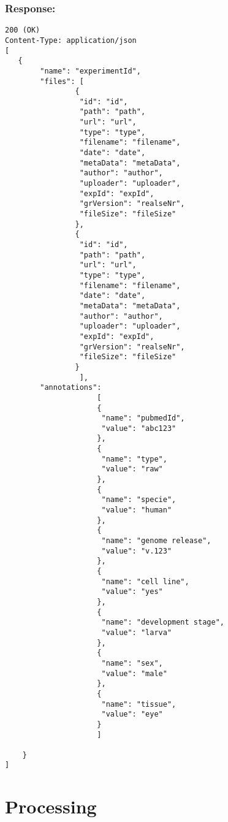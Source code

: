 \subsubsection*{Response:}
\begin{verbatim}
200 (OK)
Content-Type: application/json
[
   {
        "name": "experimentId",
        "files": [
                { 
                 "id": "id",
                 "path": "path",
                 "url": "url",
                 "type": "type",
                 "filename": "filename",
                 "date": "date",
                 "metaData": "metaData",
                 "author": "author",
                 "uploader": "uploader",
                 "expId": "expId",
                 "grVersion": "realseNr",
                 "fileSize": "fileSize"
                },
                { 
                 "id": "id",
                 "path": "path",
                 "url": "url",
                 "type": "type",
                 "filename": "filename",
                 "date": "date",
                 "metaData": "metaData",
                 "author": "author",
                 "uploader": "uploader",
                 "expId": "expId",
                 "grVersion": "realseNr",
                 "fileSize": "fileSize"
                }
                 ],
        "annotations": 
                     [
                     {
                      "name": "pubmedId",
                      "value": "abc123"
                     }, 
                     {
                      "name": "type",
                      "value": "raw"
                     },
                     {
                      "name": "specie",
                      "value": "human"
                     },
                     {
                      "name": "genome release",
                      "value": "v.123"
                     },
                     {
                      "name": "cell line",
                      "value": "yes"
                     },
                     {
                      "name": "development stage",
                      "value": "larva"
                     },
                     {
                      "name": "sex",
                      "value": "male"
                     },
                     {
                      "name": "tissue",
                      "value": "eye"
                     }
                     ]

    }
]
\end{verbatim}

\section*{Processing}

